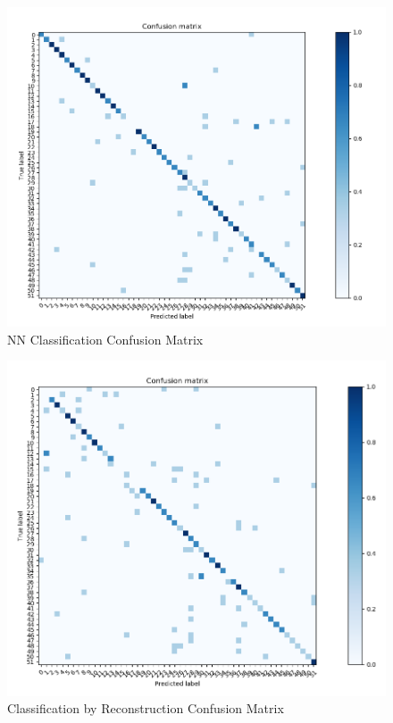 \documentclass[10pt,technote]{IEEEtran}
\begin{document}
\begin{figure}[htb!]
    \centering
    \includegraphics[width=\linewidth]{../results/1bb/confusion_NN.png}
    \caption{NN Classification Confusion Matrix}
    \label{fig:NN_conf_mat}
\end{figure}

\begin{figure}[htb!]
    \centering
    \includegraphics[width=\linewidth]{../results/1bb/confusion_rec.png}
    \caption{Classification by Reconstruction Confusion Matrix}
    \label{fig:REC_conf_mat}
\end{figure}
\end{document}
